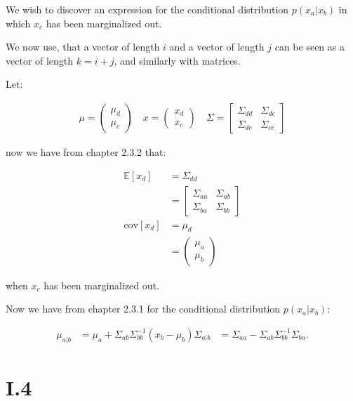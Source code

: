 We wish to discover an expression for the conditional distribution $p(x_a|x_b)$
in which $x_c$ has been marginalized out.

We now use, that a vector of length $i$ and a vector of length $j$
can be seen as a vector of length $k=i+j$, and similarly with matrices.

Let:

\begin{align*}
	\mu = \begin{pmatrix}
		\mu_d \\
		\mu_c
	\end{pmatrix} \quad
	x = \begin{pmatrix}
		x_d \\
		x_c
	\end{pmatrix} \quad
	\Sigma = \begin{bmatrix}
		\Sigma_{dd} & \Sigma_{dc} \\
		\Sigma_{dc} & \Sigma_{cc}
	\end{bmatrix}
\end{align*}

now we have from chapter 2.3.2 that:

\begin{align*}
	\mathbb{E}[x_d] &= \Sigma_{dd} \\
	&= \begin{bmatrix}
		\Sigma_{aa} & \Sigma_{ab} \\
		\Sigma_{ba} & \Sigma_{bb}
	   \end{bmatrix} \\
	\text{cov}[x_d] &= \mu_d \\
	&= \begin{pmatrix}
		\mu_a \\
		\mu_b
	   \end{pmatrix}
\end{align*}

when $x_c$ has been marginalized out.

Now we have from chapter 2.3.1 for the conditional distribution $p(x_a | x_b)$:

\begin{align*}
	\mu_{a|b} &= \mu_a + \Sigma_{ab} \Sigma_{bb}^{-1}(x_b - \mu_b)
	\Sigma_{a|b} &= \Sigma_{aa} - \Sigma_{ab} \Sigma_{bb}^{-1} \Sigma_{ba}.
\end{align*}

\pagebreak
\section{I.4}
